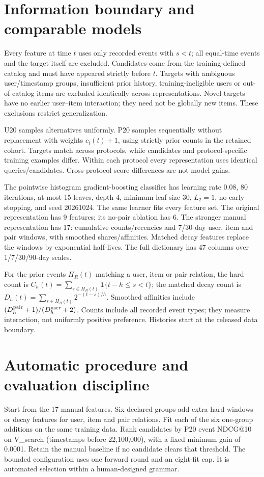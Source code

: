 \documentclass[10pt,a4paper]{article}
\begin{document}
\section{Information boundary and comparable models}
Every feature at time $t$ uses only recorded events with $s<t$; all equal-time
events and the target itself are excluded. Candidates come from the
training-defined catalog and must have appeared strictly before $t$.
Targets with ambiguous user/timestamp groups, insufficient prior history,
training-ineligible users or out-of-catalog items are excluded identically
across representations. Novel targets have no earlier user--item interaction;
they need not be globally new items. These exclusions restrict generalization.

U20 samples alternatives uniformly. P20 samples sequentially without replacement
with weights $c_i(t)+1$, using strictly prior counts in the retained cohort.
Targets match across protocols, while candidates and protocol-specific training
examples differ. Within each protocol every representation uses identical
queries/candidates. Cross-protocol score differences are not model gains.

The pointwise histogram gradient-boosting classifier has learning rate 0.08,
80 iterations, at most 15 leaves, depth 4, minimum leaf size 30, $L_2=1$,
no early stopping, and seed 20261024. The same learner fits every feature set.
The original representation has 9 features; its no-pair ablation has 6.
The stronger manual representation has 17: cumulative counts/recencies and
7/30-day user, item and pair windows, with smoothed shares/affinities.
Matched decay features replace the windows by exponential half-lives.
The full dictionary has 47 columns over 1/7/30/90-day scales.

For the prior events $H_R(t)$ matching a user, item or pair relation,
the hard count is $C_h(t)=\sum_{s\in H_R(t)}\mathbf{1}\{t-h\leq s<t\}$;
the matched decay count is $D_h(t)=\sum_{s\in H_R(t)}2^{-(t-s)/h}$.
Smoothed affinities include $(D_h^{\rm pair}+1)/(D_h^{\rm user}+2)$.
Counts include all recorded event types; they measure interaction, not
uniformly positive preference. Histories start at the released data boundary.

\section{Automatic procedure and evaluation discipline}
Start from the 17 manual features. Six declared groups add extra hard windows
or decay features for user, item and pair relations. Fit each of the six
one-group additions on the same training data. Rank candidates by P20
event NDCG@10 on V\_search (timestamps before 22,100,000), with a fixed
minimum gain of 0.0001. Retain the manual baseline if no candidate clears
that threshold. The bounded configuration uses one forward round and an
eight-fit cap. It is automated selection within a human-designed grammar.
\end{document}
